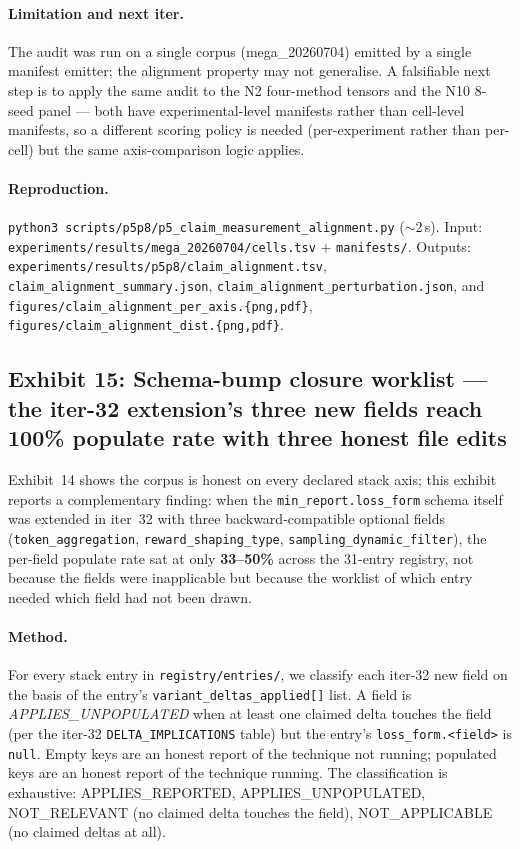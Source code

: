\documentclass{article}  \usepackage[preprint,nonatbib]{neurips_2026} \usepackage[numbers]{natbib}
\begin{document}
\paragraph{Limitation and next iter.}
The audit was run on a single corpus (mega\_20260704) emitted by a
single manifest emitter; the alignment property may not generalise.
A falsifiable next step is to apply the same audit to the N2
four-method tensors and the N10 8-seed panel — both have
experimental-level manifests rather than cell-level manifests, so a
different scoring policy is needed (per-experiment rather than
per-cell) but the same axis-comparison logic applies.

\paragraph{Reproduction.}
\texttt{python3 scripts/p5p8/p5\_claim\_measurement\_alignment.py}
($\sim$2\,s). Input: \texttt{experiments/results/mega\_20260704/cells.tsv}
$+$ \texttt{manifests/}. Outputs:
\texttt{experiments/results/p5p8/claim\_alignment.tsv},
\texttt{claim\_alignment\_summary.json},
\texttt{claim\_alignment\_perturbation.json}, and
\texttt{figures/claim\_alignment\_per\_axis.\{png,pdf\}},
\texttt{figures/claim\_alignment\_dist.\{png,pdf\}}.

\subsection{Exhibit 15: Schema-bump closure worklist --- the
iter-32 extension's three new fields reach 100\% populate rate
with three honest file edits}
\label{sec:p5-exhibit-schema-bump}

Exhibit~14 shows the corpus is honest on every declared stack axis;
this exhibit reports a complementary finding: when the
\texttt{min\_report.loss\_form} schema itself was extended in
iter~32 with three backward-compatible optional fields
(\texttt{token\_aggregation}, \texttt{reward\_shaping\_type},
\texttt{sampling\_dynamic\_filter}), the per-field populate rate sat
at only \textbf{33--50\%} across the 31-entry registry, not because
the fields were inapplicable but because the worklist of which
entry needed which field had not been drawn.

\paragraph{Method.}
For every stack entry in \texttt{registry/entries/}, we classify
each iter-32 new field on the basis of the entry's
\texttt{variant\_deltas\_applied[]} list. A field is
\emph{APPLIES\_UNPOPULATED} when at least one claimed delta touches
the field (per the iter-32 \texttt{DELTA\_IMPLICATIONS} table) but
the entry's \texttt{loss\_form.<field>} is \texttt{null}. Empty
keys are an honest report of the technique not running; populated
keys are an honest report of the technique running. The
classification is exhaustive: APPLIES\_REPORTED,
APPLIES\_UNPOPULATED, NOT\_RELEVANT (no claimed delta touches the
field), NOT\_APPLICABLE (no claimed deltas at all).
\end{document}
